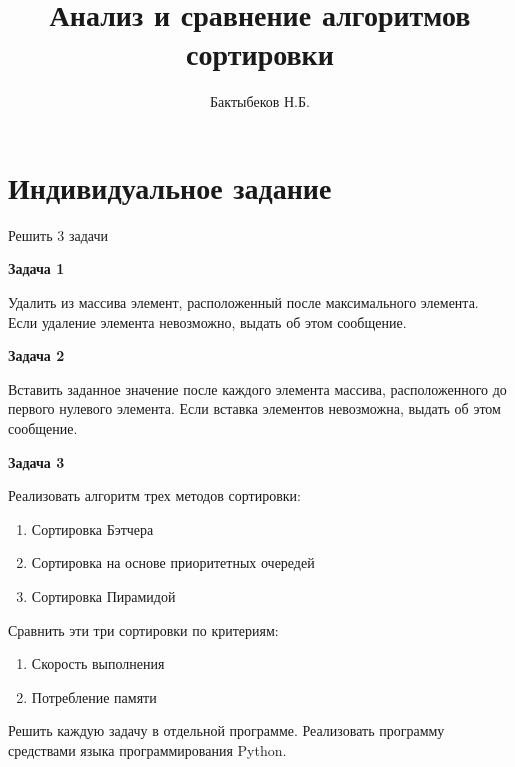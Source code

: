 

\title{Анализ и сравнение алгоритмов сортировки}
\author{Бактыбеков Н.Б.}





\newpage
\tableofcontents{}
\setcounter{page}{1}

\newpage
{}


\section*{Индивидуальное задание}

Решить 3 задачи

\textbf{Задача 1}

Удалить из массива элемент, расположенный после максимального элемента. Если удаление элемента невозможно, выдать об этом сообщение.



\textbf{Задача 2}

Вставить заданное значение после каждого элемента массива, расположенного до первого нулевого элемента. Если вставка элементов невозможна, выдать об этом сообщение.



\textbf{Задача 3}

Реализовать алгоритм трех методов сортировки:

\begin{enumerate}
    \item Сортировка Бэтчера
    \item Сортировка на основе приоритетных очередей
    \item Сортировка Пирамидой
\end{enumerate}

Сравнить эти три сортировки по критериям:

\begin{enumerate}
    \item Скорость выполнения
    \item Потребление памяти
\end{enumerate}

Решить каждую задачу в отдельной программе. Реализовать программу средствами языка программирования Python.







